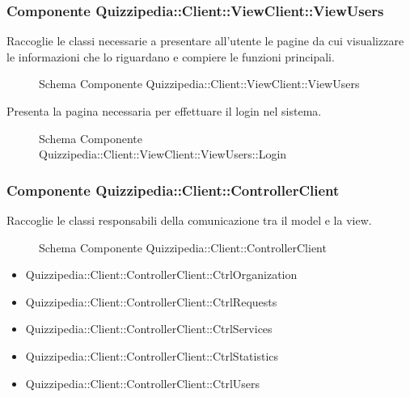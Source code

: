 \subsubsection{Componente Quizzipedia::Client::ViewClient::ViewUsers}
Raccoglie le classi necessarie a presentare all'utente le pagine da cui visualizzare le informazioni che lo riguardano e compiere le funzioni principali.
\begin{figure}[H]
\centering
\noindent{}
\caption{Schema Componente Quizzipedia::Client::ViewClient::ViewUsers}
\end{figure}
Presenta la pagina necessaria per effettuare il login nel sistema.
\begin{figure}[H]
\centering
\noindent{}
\caption{Schema Componente Quizzipedia::Client::ViewClient::ViewUsers::Login}
\end{figure}
\subsubsection{Componente Quizzipedia::Client::ControllerClient}
Raccoglie le classi responsabili della comunicazione tra il model e la view.
\begin{figure}[H]
\centering
\noindent{}
\caption{Schema Componente Quizzipedia::Client::ControllerClient}
\end{figure}
\begin{itemize}
\item Quizzipedia::Client::ControllerClient::CtrlOrganization
\item Quizzipedia::Client::ControllerClient::CtrlRequests
\item Quizzipedia::Client::ControllerClient::CtrlServices
\item Quizzipedia::Client::ControllerClient::CtrlStatistics
\item Quizzipedia::Client::ControllerClient::CtrlUsers
\end{itemize}

